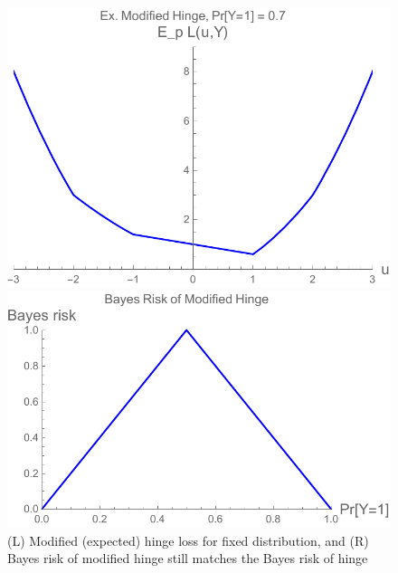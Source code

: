 \documentclass[11pt]{article}
\newcommand{\reals}{\mathbb{R}}
\newcommand{\prop}[1]{\mathrm{prop}[#1]}
\newcommand{\simplex}{\Delta_\Y}
\newcommand{\Sc}{\mathcal{S}}
\newcommand{\U}{\mathcal{U}}
\newcommand{\Y}{\mathcal{Y}}
\newcommand{\risk}[1]{\underline{#1}}
\newtheorem{lemma}{Lemma}
\begin{document}
\begin{figure}
	\begin{minipage}{0.47\linewidth}
		\centering
		\includegraphics[width=0.95\linewidth]{figs/modhinge.pdf}
	\end{minipage}
	\hfill
	\begin{minipage}{0.47\linewidth}
		\centering		\includegraphics[width=0.95\linewidth]{figs/modhinge-br.pdf}
	\end{minipage}
	\caption{(L) Modified (expected) hinge loss for fixed distribution, and (R) Bayes risk of modified hinge still matches the Bayes risk of hinge}
	\label{fig:modified-hinge}
\end{figure}



\end{document}

